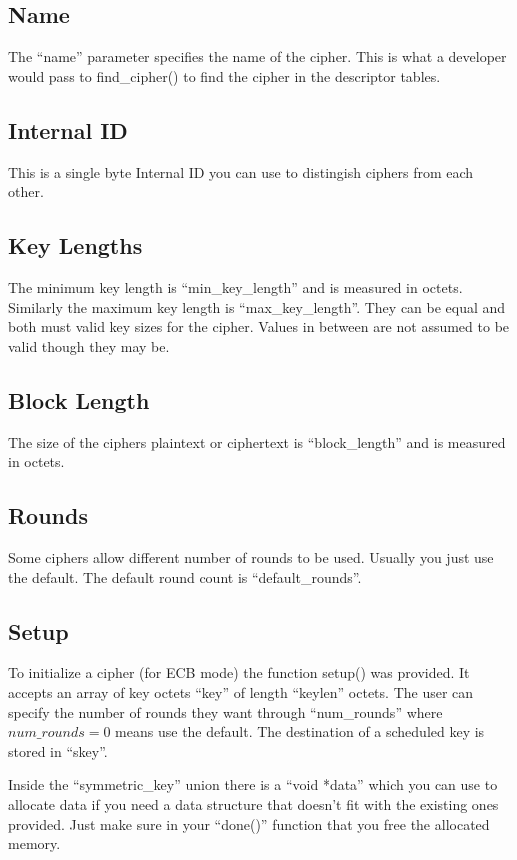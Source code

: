 \documentclass[a4paper]{book}
\begin{document}
\subsection{Name}
The ``name'' parameter specifies the name of the cipher.  This is what a developer would pass to find\_cipher() to find the cipher in the descriptor
tables.

\subsection{Internal ID}
This is a single byte Internal ID you can use to distingish ciphers from each other.

\subsection{Key Lengths}
The minimum key length is ``min\_key\_length'' and is measured in octets.  Similarly the maximum key length is ``max\_key\_length''.  They can be equal
and both must valid key sizes for the cipher.  Values in between are not assumed to be valid though they may be.

\subsection{Block Length}
The size of the ciphers plaintext or ciphertext is ``block\_length'' and is measured in octets.

\subsection{Rounds}
Some ciphers allow different number of rounds to be used.  Usually you just use the default.  The default round count is ``default\_rounds''.

\subsection{Setup}
To initialize a cipher (for ECB mode) the function setup() was provided.  It accepts an array of key octets ``key'' of length ``keylen'' octets.  The user
can specify the number of rounds they want through ``num\_rounds'' where $num\_rounds = 0$ means use the default.  The destination of a scheduled key is stored
in ``skey''.

Inside the ``symmetric\_key'' union there is a ``void *data'' which you can use to allocate data if you need a data structure that doesn't fit with the existing
ones provided.  Just make sure in your ``done()'' function that you free the allocated memory.
\end{document}
